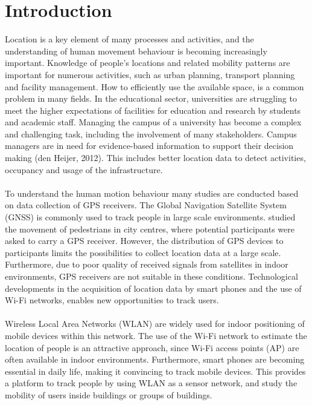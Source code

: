 \section{Introduction}\label{1-introduction}
Location is a key element of many processes and activities, and the understanding of human movement behaviour is becoming increasingly important. Knowledge of people’s locations and related mobility patterns are important for numerous activities, such as urban planning, transport planning and facility management. How to efficiently use the available space, is a common problem in many fields. In the educational sector, universities are struggling to meet the higher expectations of facilities for education and research by students and academic staff. Managing the campus of a university has become a complex and challenging task, including the involvement of many stakeholders. Campus managers are in need for evidence-based information to support their decision making (den Heijer, 2012).  This includes better location data to detect activities, occupancy and usage of the infrastructure.
\\\\
To understand the human motion behaviour many studies are conducted based on data collection of GPS receivers. The Global Navigation Satellite System (GNSS) is commonly used to track people in large scale environments. \cite{Stefan} studied the movement of pedestrians in city centres, where potential participants were asked to carry a GPS receiver. However, the distribution of GPS devices to participants limits the possibilities to collect location data at a large scale. Furthermore, due to poor quality of received signals from satellites in indoor environments, GPS receivers are not suitable in these conditions. Technological developments in the acquisition of location data by smart phones and the use of Wi-Fi networks, enables new opportunities to track users. 
\\\\
Wireless Local Area Networks (WLAN) are widely used for indoor positioning of mobile devices within this network. The use of the Wi-Fi network to estimate the location of people is an attractive approach, since Wi-Fi access points (AP) are often available in indoor environments. Furthermore, smart phones are becoming essential in daily life, making it convincing to track mobile devices. This provides a platform to track people by using WLAN as a sensor network, and study the mobility of users inside buildings or groups of buildings. 
